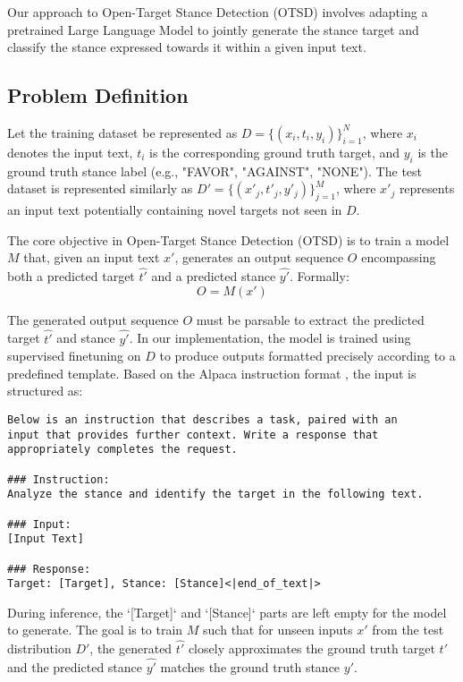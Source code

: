\documentclass[twocolumn, 11pt,letterpaper]{article}
\begin{document}
Our approach to Open-Target Stance Detection (OTSD) involves adapting a pretrained Large Language Model to jointly generate the stance target and classify the stance expressed towards it within a given input text.

\subsection{Problem Definition}
\label{sec:problem_definition}

Let the training dataset be represented as $D = \{(x_i, t_i, y_i)\}_{i=1}^{N}$, where $x_i$ denotes the input text, $t_i$ is the corresponding ground truth target, and $y_i$ is the ground truth stance label (e.g., "FAVOR", "AGAINST", "NONE"). The test dataset is represented similarly as $D' = \{(x'_j, t'_j, y'_j)\}_{j=1}^{M}$, where $x'_j$ represents an input text potentially containing novel targets not seen in $D$.

The core objective in Open-Target Stance Detection (OTSD) is to train a model $M$ that, given an input text $x'$, generates an output sequence $O$ encompassing both a predicted target $\hat{t'}$ and a predicted stance $\hat{y'}$.
Formally:
\[ O = M(x') \]

The generated output sequence $O$ must be parsable to extract the predicted target $\hat{t'}$ and stance $\hat{y'}$. In our implementation, the model is trained using supervised finetuning on $D$ to produce outputs formatted precisely according to a predefined template. Based on the Alpaca instruction format \cite{tts}, the input is structured as:

\begin{lstlisting}
Below is an instruction that describes a task, paired with an
input that provides further context. Write a response that
appropriately completes the request.

### Instruction:
Analyze the stance and identify the target in the following text.

### Input:
[Input Text]

### Response:
Target: [Target], Stance: [Stance]<|end_of_text|>
\end{lstlisting}

During inference, the `[Target]` and `[Stance]` parts are left empty for the model to generate. The goal is to train $M$ such that for unseen inputs $x'$ from the test distribution $D'$, the generated $\hat{t'}$ closely approximates the ground truth target $t'$ and the predicted stance $\hat{y'}$ matches the ground truth stance $y'$.
\end{document}
